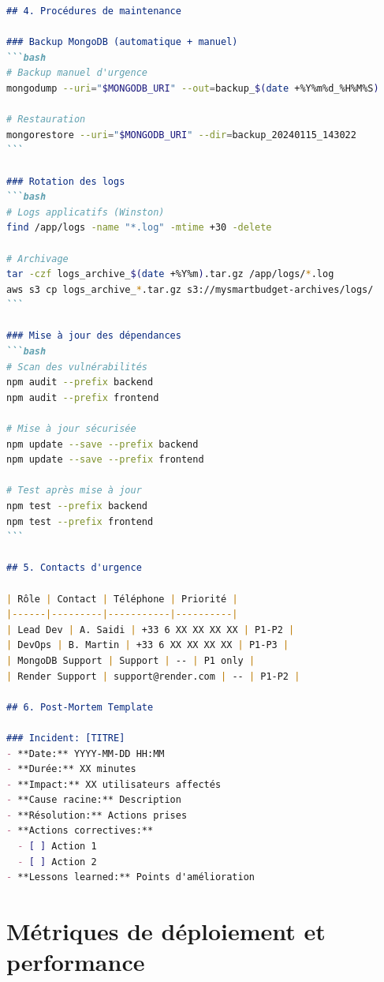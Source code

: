 \begin{exemple}
\begin{lstlisting}[language=markdown]
## 4. Procédures de maintenance

### Backup MongoDB (automatique + manuel)
```bash
# Backup manuel d'urgence
mongodump --uri="$MONGODB_URI" --out=backup_$(date +%Y%m%d_%H%M%S)

# Restauration
mongorestore --uri="$MONGODB_URI" --dir=backup_20240115_143022
```

### Rotation des logs
```bash
# Logs applicatifs (Winston)
find /app/logs -name "*.log" -mtime +30 -delete

# Archivage
tar -czf logs_archive_$(date +%Y%m).tar.gz /app/logs/*.log
aws s3 cp logs_archive_*.tar.gz s3://mysmartbudget-archives/logs/
```

### Mise à jour des dépendances
```bash
# Scan des vulnérabilités
npm audit --prefix backend
npm audit --prefix frontend

# Mise à jour sécurisée
npm update --save --prefix backend
npm update --save --prefix frontend

# Test après mise à jour
npm test --prefix backend
npm test --prefix frontend
```

## 5. Contacts d'urgence

| Rôle | Contact | Téléphone | Priorité |
|------|---------|-----------|----------|
| Lead Dev | A. Saidi | +33 6 XX XX XX XX | P1-P2 |
| DevOps | B. Martin | +33 6 XX XX XX XX | P1-P3 |
| MongoDB Support | Support | -- | P1 only |
| Render Support | support@render.com | -- | P1-P2 |

## 6. Post-Mortem Template

### Incident: [TITRE]
- **Date:** YYYY-MM-DD HH:MM
- **Durée:** XX minutes
- **Impact:** XX utilisateurs affectés
- **Cause racine:** Description
- **Résolution:** Actions prises
- **Actions correctives:** 
  - [ ] Action 1
  - [ ] Action 2
- **Lessons learned:** Points d'amélioration
\end{lstlisting}
\end{exemple}

\section{Métriques de déploiement et performance}

